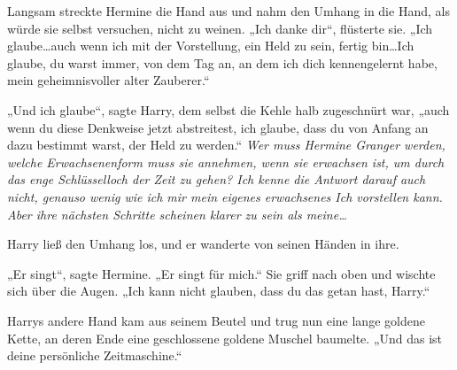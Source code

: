 Langsam streckte Hermine die Hand aus und nahm den Umhang in die Hand, als würde sie selbst versuchen, nicht zu weinen.
„Ich danke dir“, flüsterte sie. „Ich glaube…auch wenn ich mit der Vorstellung, ein Held zu sein, fertig bin…Ich glaube, du warst immer, von dem Tag an, an dem ich dich kennengelernt habe, mein geheimnisvoller alter Zauberer.“

„Und ich glaube“, sagte Harry, dem selbst die Kehle halb zugeschnürt war, „auch wenn du diese Denkweise jetzt abstreitest, ich glaube, dass du von Anfang an dazu bestimmt warst, der Held zu werden.“
\emph{Wer muss Hermine Granger werden, welche Erwachsenenform muss sie annehmen, wenn sie erwachsen ist, um durch das enge Schlüsselloch der Zeit zu gehen? Ich kenne die Antwort darauf auch nicht, genauso wenig wie ich mir mein eigenes erwachsenes Ich vorstellen kann. Aber ihre nächsten Schritte scheinen klarer zu sein als meine…}

Harry ließ den Umhang los, und er wanderte von seinen Händen in ihre.

„Er singt“, sagte Hermine. „Er singt für mich.“ Sie griff nach oben und wischte sich über die Augen. „Ich kann nicht glauben, dass du das getan hast, Harry.“

Harrys andere Hand kam aus seinem Beutel und trug nun eine lange goldene Kette, an deren Ende eine geschlossene goldene Muschel baumelte.
„Und das ist deine persönliche Zeitmaschine.“

